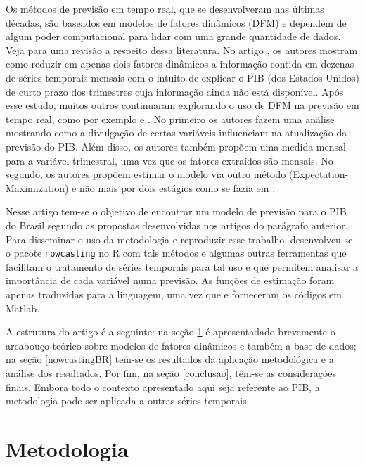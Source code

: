 \documentclass{article}
\begin{document}
Os métodos de previsão em tempo real, que se desenvolveram nas últimas décadas, são baseados em modelos de fatores dinâmicos (DFM) e dependem de algum poder computacional para lidar com uma grande quantidade de dados. Veja \cite{stockwatson2006} para uma revisão a respeito dessa literatura. No artigo \cite{giannoneetal2008}, os autores mostram como reduzir em apenas dois fatores dinâmicos a informação contida em dezenas de séries temporais mensais com o intuito de explicar o PIB (dos Estados Unidos) de curto prazo dos trimestres cuja informação ainda não está disponível. Após esse estudo, muitos outros continuaram explorando o uso de DFM na previsão em tempo real, como por exemplo \cite{banburarunstler2011} e \cite{banburaetal2011}. No primeiro os autores fazem uma análise mostrando como a divulgação de certas variáveis influenciam na atualização da previsão do PIB. Além disso, os autores também propõem uma medida mensal para a variável trimestral, uma vez que os fatores extraídos são mensais. No segundo, os autores propõem estimar o modelo via outro método (Expectation-Maximization) e não mais por dois estágios como se fazia em \cite{giannoneetal2008}.

Nesse artigo tem-se o objetivo de encontrar um modelo de previsão para o PIB do Brasil segundo as propostas desenvolvidas nos artigos do parágrafo anterior. Para disseminar o uso da metodologia e reproduzir esse trabalho, desenvolveu-se o pacote \texttt{nowcasting} no \textsf{R} com tais métodos e algumas outras ferramentas que facilitam o tratamento de séries temporais para tal uso e que permitem analisar a importância de cada variável numa previsão. As funções de estimação foram apenas traduzidas para a linguagem, uma vez que \cite{giannoneetal2008} e \cite{banburaetal2011} forneceram os códigos em \textsf{Matlab}.

A estrutura do artigo é a seguinte: na seção \ref{metodo} é apresentadado brevemente o arcabouço teórico sobre modelos de fatores dinâmicos e também a base de dados; na seção \ref{nowcastingBR} tem-se os resultados da aplicação metodológica e a análise dos resultados. Por fim, na seção \ref{conclusao}, têm-se as considerações finais. Embora todo o contexto apresentado aqui seja referente ao PIB, a metodologia pode ser aplicada a outras séries temporais.

\section{Metodologia}\label{metodo}
\end{document}
